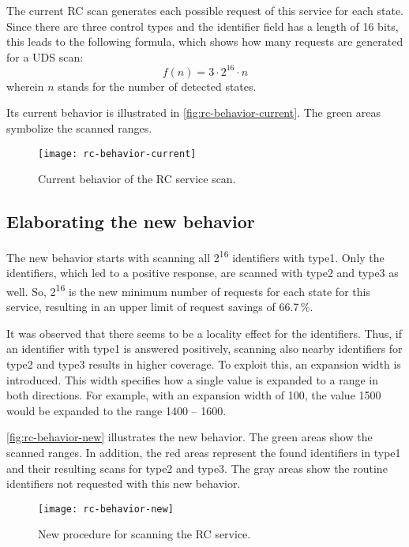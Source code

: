 The current RC scan generates each possible request of this service for each state. Since there are three control types and the identifier field has a length of 16 bits, this leads to the following formula, which shows how many requests are generated for a UDS scan:
\[f(n)=3 \cdot 2^{16} \cdot n\]
wherein $n$ stands for the number of detected states.

Its current behavior is illustrated in \autoref{fig:rc-behavior-current}. The green areas symbolize the scanned ranges.

\begin{figure}[htb]
    \centering
    \texttt{[image: rc-behavior-current]}
    \caption{Current behavior of the RC service scan.}
    \label{fig:rc-behavior-current}
\end{figure}

\subsection{Elaborating the new behavior}
\label{subsubsec:rc-elaborating}

The new behavior starts with scanning all 2\textsuperscript{16} identifiers with type1. Only the identifiers, which led to a positive response, are scanned with type2 and type3 as well. So, 2\textsuperscript{16} is the new minimum number of requests for each state for this service, resulting in an upper limit of request savings of 66.7\,\%.

It was observed that there seems to be a locality effect for the identifiers. Thus, if an identifier with type1 is answered positively, scanning also nearby identifiers for type2 and type3 results in higher coverage. To exploit this, an expansion width is introduced. This width specifies how a single value is expanded to a range in both directions. For example, with an expansion width of 100, the value 1500 would be expanded to the range 1400 – 1600.

\autoref{fig:rc-behavior-new} illustrates the new behavior. The green areas show the scanned ranges. In addition, the red areas represent the found identifiers in type1 and their resulting scans for type2 and type3. The gray areas show the routine identifiers not requested with this new behavior.

\begin{figure}[htb]
    \centering
    \texttt{[image: rc-behavior-new]}
    \caption{New procedure for scanning the RC service.}
    \label{fig:rc-behavior-new}
\end{figure}

